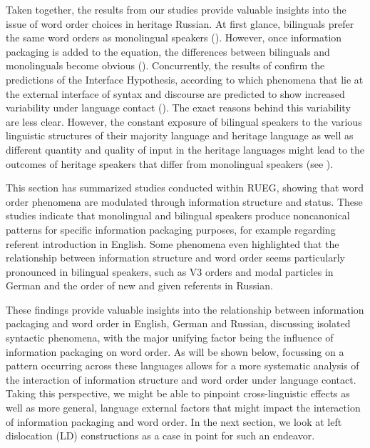 \documentclass[output=paper,colorlinks,citecolor=brown]{langscibook}
\begin{document}
Taken together, the results from our studies provide valuable insights into the issue of word order choices in heritage Russian. At first glance, bilinguals prefer the same word orders as monolingual speakers (\cite{martynova_ovvo_nodate, zuban_word_2021}). However, once information packaging is added to the equation, the differences between bilinguals and monolinguals become obvious (\cite{zuban_unexpected_2023, zuban_word_submitted}). Concurrently, the results of \citet{zuban_unexpected_2023, zuban_word_submitted} confirm the predictions of the Interface Hypothesis, according to which phenomena that lie at the external interface of syntax and discourse are predicted to show increased variability under language contact (\cite{sorace_epistemological_2011}). The exact reasons behind this variability are less clear. However, the constant exposure of bilingual speakers to the various linguistic structures of their majority language and heritage language as well as different quantity and quality of input in the heritage languages might lead to the outcomes of heritage speakers that differ from monolingual speakers (see \cite{SoraceSerratrice2009, zuban_different_2023}).

This section has summarized studies conducted within RUEG, showing that word order phenomena are modulated through information structure and status. These studies indicate that monolingual and bilingual speakers produce noncanonical patterns for specific information packaging purposes, for example regarding referent introduction in English. Some phenomena even highlighted that the relationship between information structure and word order seems particularly pronounced in bilingual speakers, such as V3 orders and modal particles in German and the order of new and given referents in Russian.

These findings provide valuable insights into the relationship between information packaging and word order in English, German and Russian, discussing isolated syntactic phenomena, with the major unifying factor being the influence of information packaging on word order. As will be shown below, focussing on a pattern occurring across these languages allows for a more systematic analysis of the interaction of information structure and word order under language contact. Taking this perspective, we might be able to pinpoint cross-linguistic effects as well as more general, language external factors that might impact the interaction of information packaging and word order. In the next section, we look at left dislocation (LD) constructions as a case in point for such an endeavor.  
\end{document}
